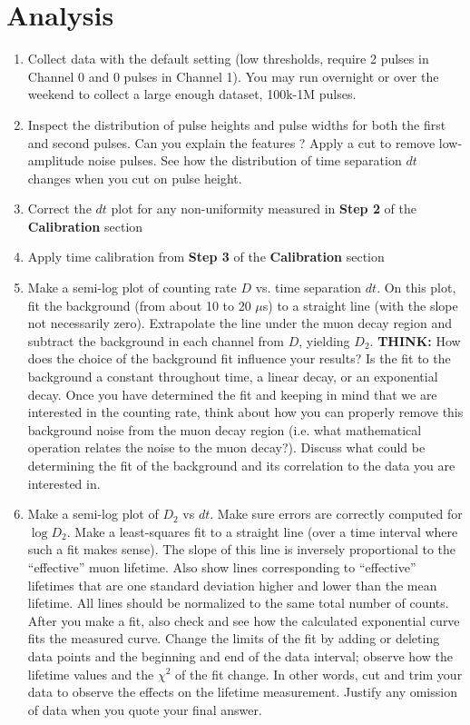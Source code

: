 \documentclass{../lab}
\begin{document}
\section{Analysis}

\begin{enumerate}
    \item Collect data with the default setting (low thresholds, require 2 pulses in Channel 0 and 0 pulses in Channel 1). You may run overnight or over the weekend to collect a large enough dataset, 100k-1M pulses.

    \item Inspect the distribution of pulse heights and pulse widths for both the first and second pulses. Can you explain the features ? Apply a cut to remove low-amplitude noise pulses. See how the distribution of time separation $dt$ changes when you cut on pulse height.

    \item Correct the $dt$ plot for any non-uniformity measured in \textbf{Step 2} of the \textbf{Calibration} section

    \item Apply time calibration from \textbf{Step 3} of the \textbf{Calibration} section

    \item Make a semi-log plot of counting rate $D$ vs. time separation $dt$. On this plot, fit the background (from about 10 to 20 $\mu $s) to a straight line (with the slope not necessarily zero). Extrapolate the line under the muon decay region and subtract the background in each channel from $D$, yielding $D_2$. \textbf{THINK:} How does the choice of the background fit influence your results? Is the fit to the background a constant throughout time, a linear decay, or an exponential decay. Once you have determined the fit and keeping in mind that we are interested in the counting rate, think about how you can properly remove this background noise from the muon decay region (i.e. what mathematical operation relates the noise to the muon decay?). Discuss what could be determining the fit of the background and its correlation to the data you are interested in.

\newpage

    \item Make a semi-log plot of $D_2$ vs $dt$. Make sure errors are correctly computed for $\log D_2$. Make a least-squares fit to a straight line (over a time interval where such a fit makes sense). The slope of this line is inversely proportional to the ``effective'' muon lifetime. Also show lines corresponding to ``effective'' lifetimes that are one standard deviation higher and lower than the mean lifetime. All lines should be normalized to the same total number of counts. After you make a fit, also check and see how the calculated exponential curve fits the measured curve. Change the limits of the fit by adding or deleting data points and the beginning and end of the data interval; observe how the lifetime values and the $\chi^2$ of the fit change. In other words, cut and trim your data to observe the effects on the lifetime measurement. Justify any omission of data when you quote your final answer.


\end{enumerate}
\end{document}
